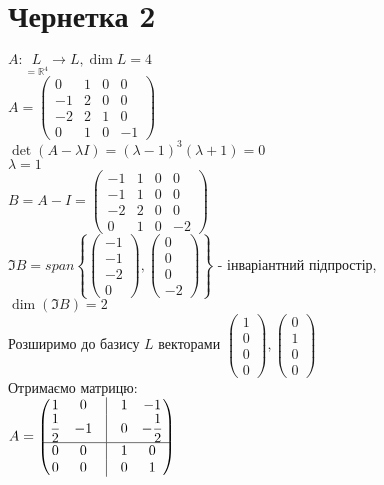 \documentclass[a4paper, 10pt]{article}
\theoremstyle{theoremdd}
\begin{document}
\section*{Чернетка 2}
$A: \underset{= \mathbb{R}^4}{L} \to L, \dim L = 4$\\
$A = \begin{pmatrix}
0 & 1 & 0 & 0 \\
-1 & 2 & 0 & 0 \\
-2 & 2 & 1 & 0 \\
0 & 1 & 0 & -1
\end{pmatrix}$\\
$\det(A-\lambda I) = (\lambda - 1)^3(\lambda + 1) = 0$\\
$\lambda = 1$\\
$B = A - I = \begin{pmatrix}
-1 & 1 & 0 & 0 \\
-1 & 1 & 0 & 0 \\
-2 & 2 & 0 & 0 \\
0 & 1 & 0 & -2
\end{pmatrix}$\\
$\Im B = span\left\{ \begin{pmatrix} -1 \\ -1 \\ -2 \\ 0 \end{pmatrix}, \begin{pmatrix} 0 \\ 0 \\ 0 \\ -2 \end{pmatrix} \right\}$ - інваріантний підпростір, \\ $\dim (\Im B) = 2$\\
Розширимо до базису $L$ векторами $\begin{pmatrix} 1 \\ 0 \\ 0 \\ 0 \end{pmatrix}, \begin{pmatrix} 0 \\ 1 \\ 0 \\ 0 \end{pmatrix}$\\
Отримаємо матрицю:\\
$A = \begin{pmatrix}
1 & 0 & \vline & 1 & -1 \\
\dfrac{1}{2} & -1 & \vline & 0 & -\dfrac{1}{2} \\
\hline
0 & 0 & \vline & 1 & 0 \\
0 & 0 & \vline & 0 & 1
\end{pmatrix}$\\
\end{document}
